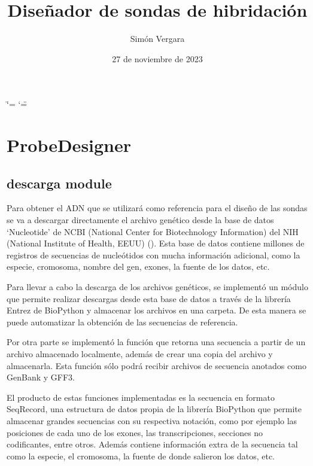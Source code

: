 \documentclass[letterpaper,10pt,spanish]{sphinxmanual}
\title{Diseñador de sondas de hibridación}
\date{27 de noviembre de 2023}
\author{Simón Vergara}
\begin{document}
\ifdefined\shorthandoff
  \ifnum\catcode`\=\string=\active\shorthandoff{=}\fi
  \ifnum\catcode`\"=\active{}\fi
\fi

\pagestyle{empty}
\sphinxmaketitle
\pagestyle{plain}
\sphinxtableofcontents
\pagestyle{normal}
\label{\detokenize{index::doc}}


\sphinxstepscope


\chapter{Probe\sphinxhyphen{}Designer}
\label{\detokenize{modules:probe-designer}}\label{\detokenize{modules::doc}}
\sphinxstepscope


\section{descarga module}
\label{\detokenize{descarga:descarga-module}}\label{\detokenize{descarga::doc}}
\sphinxAtStartPar
Para obtener el ADN que se utilizará como referencia para el diseño de las sondas se va a descargar directamente el archivo genético desde la base de datos ‘Nucleotide’ de NCBI (National Center for Biotechnology Information) del NIH (National Institute of Health, EEUU) (). Esta base de datos contiene millones de registros de secuencias de nucleótidos con mucha información adicional, como la especie, cromosoma, nombre del gen, exones, la fuente de los datos, etc.

\sphinxAtStartPar
Para llevar a cabo la descarga de los archivos genéticos, se implementó un módulo que permite realizar descargas desde esta base de datos a través de la librería Entrez de BioPython y almacenar los archivos en una carpeta. De esta manera se puede automatizar la obtención de las secuencias de referencia.

\sphinxAtStartPar
Por otra parte se implementó la función que retorna una secuencia a partir de un archivo almacenado localmente, además de crear una copia del archivo y almacenarla. Esta función sólo podrá recibir archivos de secuencia anotados como GenBank y GFF3.

\sphinxAtStartPar
El producto de estas funciones implementadas es la secuencia en formato SeqRecord, una estructura de datos propia de la librería BioPython que permite almacenar grandes secuencias con su respectiva notación, como por ejemplo las posiciones de cada uno de los exones, las transcripciones, secciones no codificantes, entre otros. Además contiene información extra de la secuencia tal como la especie, el cromosoma, la fuente de donde salieron los datos, etc.
\label{\detokenize{descarga:module-descarga}}
\end{document}

